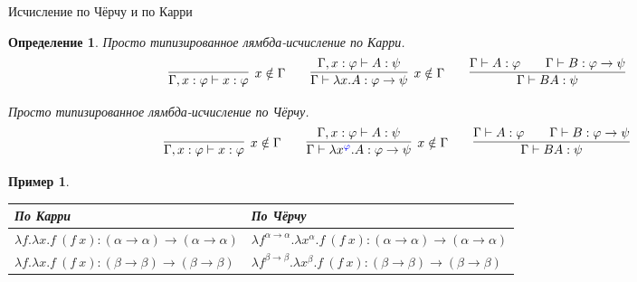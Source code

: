 \documentclass[aspectratio=169]{beamer}
\newtheorem{dfn}{Определение}[section]
\newtheorem{exm}{Пример}[section]
\begin{document}
\begin{frame}{Исчисление по Чёрчу и по Карри}
\begin{dfn}
Просто типизированное лямбда-исчисление по Карри.
$$\infer[x \notin \Gamma]{\Gamma,x:\varphi \vdash x:\varphi}{} \quad\quad 
  \infer[x \notin \Gamma]{\Gamma\vdash \lambda x.A: \varphi\rightarrow\psi}{\Gamma,x:\varphi\vdash A:\psi} \quad\quad 
  \infer{\Gamma\vdash B A:\psi}{\Gamma\vdash A:\varphi\quad\quad\Gamma\vdash B:\varphi\rightarrow\psi}$$

Просто типизированное лямбда-исчисление по Чёрчу. 
$$\infer[x \notin \Gamma]{\Gamma,x:\varphi \vdash x:\varphi}{} \quad\quad 
  \infer[x \notin \Gamma]{\Gamma\vdash \lambda x^{\color{blue}\varphi}.A: \varphi\rightarrow\psi}{\Gamma,x:\varphi\vdash A:\psi} \quad\quad 
  \infer{\Gamma\vdash B A:\psi}{\Gamma\vdash A:\varphi\quad\quad\Gamma\vdash B:\varphi\rightarrow\psi}$$
\end{dfn}\pause

\begin{exm}
\begin{tabular}{l|l}
По Карри & По Чёрчу\\\hline
$\lambda f.\lambda x.f\ (f\ x) : (\alpha\rightarrow\alpha)\rightarrow(\alpha\rightarrow\alpha)$ & $\lambda f^{\alpha\rightarrow\alpha}.\lambda x^\alpha.f\ (f\ x) : (\alpha\rightarrow\alpha)\rightarrow(\alpha\rightarrow\alpha)$\\\pause
$\lambda f.\lambda x.f\ (f\ x) : (\beta\rightarrow\beta)\rightarrow(\beta\rightarrow\beta)$ & $\lambda f^{\beta\rightarrow\beta}.\lambda x^\beta.f\ (f\ x) : (\beta\rightarrow\beta)\rightarrow(\beta\rightarrow\beta)$
\end{tabular}
\end{exm}

\end{frame}
\end{document}
